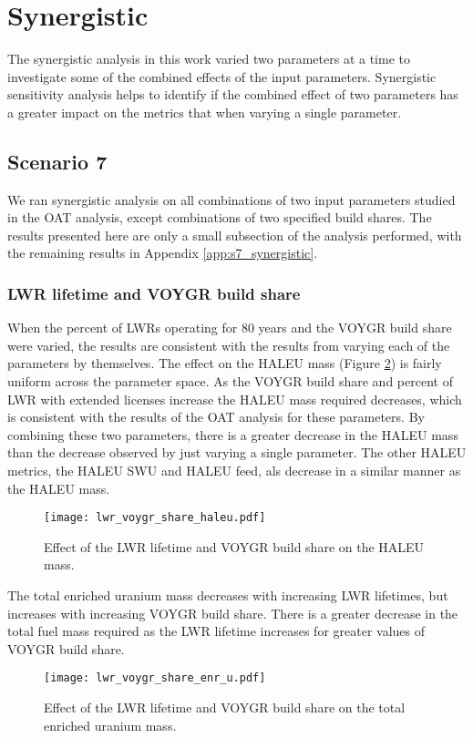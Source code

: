 \section{Synergistic}
The synergistic analysis in this work varied two parameters at a time to 
investigate some of the combined effects of the input parameters. Synergistic 
sensitivity analysis helps to identify if the combined effect of two parameters 
has a greater impact on the metrics that when varying a single parameter. 

\subsection{Scenario 7}\label{sec:s7_synergistic}
We ran synergistic 
analysis on all combinations of two input parameters studied in the \gls{OAT} 
analysis, except combinations of two specified build shares. The
results presented here are only a small subsection of the analysis performed, 
with the remaining results in Appendix \ref{app:s7_synergistic}.

\subsubsection{LWR lifetime and VOYGR build share}
When the percent of \glspl{LWR} operating for 80 years and the VOYGR build share 
were varied, the results are consistent with the results from varying 
each of the parameters by themselves. The effect on the \gls{HALEU} mass 
(Figure \ref{fig:lwr_voygr_share_enr_u}) is fairly uniform across the 
parameter space. As the VOYGR build share and percent of \gls{LWR} with 
extended licenses increase the \gls{HALEU} mass required decreases, 
which is consistent with the results of the \gls{OAT} analysis for these 
parameters. By combining these two parameters, there is a greater 
decrease in the \gls{HALEU} mass than the decrease observed by just varying 
a single parameter. The other \gls{HALEU} metrics, the \gls{HALEU} \gls{SWU} 
and \gls{HALEU} feed, als decrease in a similar manner as the \gls{HALEU} mass. 

\begin{figure}[ht]
    \centering
    \texttt{[image: lwr\_voygr\_share\_haleu.pdf]}
    \caption{Effect of the LWR lifetime and VOYGR build share on the HALEU mass.}
    \label{fig:lwr_voygr_share_haleu}
\end{figure}

The total enriched uranium mass decreases with increasing \gls{LWR} 
lifetimes, but increases with increasing VOYGR build share. There is a 
greater decrease in the total fuel mass required as the \gls{LWR} 
lifetime increases for greater values of VOYGR build share. 
\begin{figure}[ht]
    \centering
    \texttt{[image: lwr\_voygr\_share\_enr\_u.pdf]}
    \caption{Effect of the LWR lifetime and VOYGR build share on 
    the total enriched uranium mass.}
    \label{fig:lwr_voygr_share_enr_u}
\end{figure}

